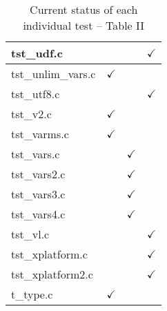 \begin{table}[H]
\begin{tabular}{|l|c|c|c|}
tst\_udf.c              &               &               & $\checkmark$  \\ \hline
tst\_unlim\_vars.c      & $\checkmark$  &               &               \\ \hline
tst\_utf8.c             &               &               & $\checkmark$  \\ \hline
tst\_v2.c               & $\checkmark$  &               &               \\ \hline
tst\_varms.c            & $\checkmark$  &               &               \\ \hline
tst\_vars.c             &               & $\checkmark$  &               \\ \hline
tst\_vars2.c            &               & $\checkmark$  &               \\ \hline
tst\_vars3.c            &               & $\checkmark$  &               \\ \hline
tst\_vars4.c            &               & $\checkmark$  &               \\ \hline
tst\_vl.c               &               &               & $\checkmark$  \\ \hline
tst\_xplatform.c        &               &               & $\checkmark$  \\ \hline
tst\_xplatform2.c       &               &               & $\checkmark$  \\ \hline
t\_type.c               & $\checkmark$  &               &               \\ \hline
\hline
\end{tabular}
\caption{\label{tab:nc_test4_status_2} Current status of each individual test -- Table II}
\end{table}

\clearpage